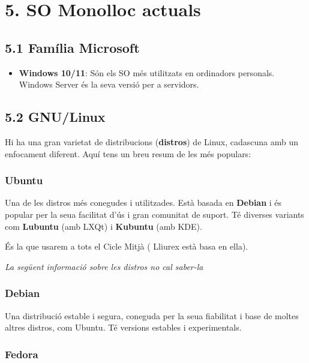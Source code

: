 \documentclass[
  a4paper,
]{article}
\providecommand{\tightlist}{%
  \setlength{\itemsep}{0pt}\setlength{\parskip}{0pt}}
\begin{document}
\section{5. SO Monolloc actuals}\label{so-monolloc-actuals}

\subsection{5.1 Família Microsoft}\label{famuxedlia-microsoft}

\begin{itemize}
\tightlist
\item
  \textbf{Windows 10/11}: Són els SO més utilitzats en ordinadors
  personals. Windows Server és la seva versió per a servidors.
\end{itemize}

\subsection{5.2 GNU/Linux}\label{gnulinux}

Hi ha una gran varietat de distribucions (\textbf{distros}) de Linux,
cadascuna amb un enfocament diferent. Aquí tens un breu resum de les més
populars:

\subsubsection{Ubuntu}\label{ubuntu}

Una de les distros més conegudes i utilitzades. Està basada en
\textbf{Debian} i és popular per la seua facilitat d'ús i gran comunitat
de suport. Té diverses variants com \textbf{Lubuntu} (amb LXQt) i
\textbf{Kubuntu} (amb KDE).

És la que usarem a tots el Cicle Mitjà ( Lliurex està basa en ella).

\emph{La següent informació sobre les distros no cal saber-la}

\subsubsection{Debian}\label{debian}

Una distribució estable i segura, coneguda per la seua fiabilitat i base
de moltes altres distros, com Ubuntu. Té versions estables i
experimentals.

\subsubsection{Fedora}\label{fedora}
\end{document}
